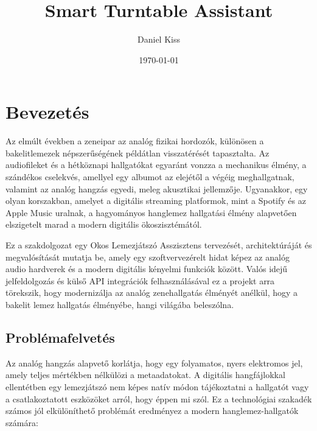 \documentclass[12pt,a4paper,hungarian]{report}
\title{Smart Turntable Assistant}
\author{Daniel Kiss}
\date{\today}
\begin{document}
\sloppy

\maketitle
\tableofcontents

\chapter{Bevezetés}


Az elmúlt években a zeneipar az analóg fizikai hordozók, különösen a bakelitlemezek népszerűségének példátlan visszatérését tapasztalta. Az audiofileket és a hétköznapi hallgatókat egyaránt vonzza a mechanikus élmény, a szándékos cselekvés, amellyel egy albumot az elejétől a végéig meghallgatnak, valamint az analóg hangzás egyedi, meleg akusztikai jellemzője. Ugyanakkor, egy olyan korszakban, amelyet a digitális streaming platformok, mint a Spotify és az Apple Music uralnak, a hagyományos hanglemez hallgatási élmény alapvetően elszigetelt marad a modern digitális ökoszisztémától.

Ez a szakdolgozat egy Okos Lemezjátszó Asszisztens tervezését, architektúráját és megvalósítását mutatja be, amely egy szoftvervezérelt hidat képez az analóg audio hardverek és a modern digitális kényelmi funkciók között. Valós idejű jelfeldolgozás és külső API integrációk felhasználásával ez a projekt arra törekszik, hogy modernizálja az analóg zenehallgatás élményét anélkül, hogy a bakelit lemez hallgatás élményébe, hangi világába beleszólna.

\section{Problémafelvetés}

Az analóg hangzás alapvető korlátja, hogy egy folyamatos, nyers elektromos jel, amely teljes mértékben nélkülözi a metaadatokat. A digitális hangfájlokkal ellentétben egy lemezjátszó nem képes natív módon tájékoztatni a hallgatót vagy a csatlakoztatott eszközöket arról, hogy éppen mi szól. Ez a technológiai szakadék számos jól elkülöníthető problémát eredményez a modern hanglemez-hallgatók számára:
\end{document}
